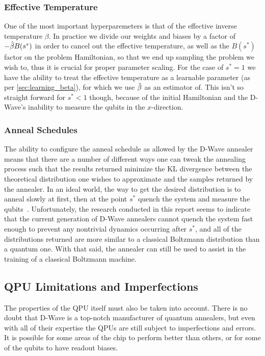 \subsubsection{Effective Temperature}
One of the most important hyperparemeters is that of the effective inverse temperature \( \beta \).
In practice we divide our weights and biases by a factor of \( -\hat{\beta} B(s^*) \) in order to cancel out the effective temperature, as well as the \( B(s^*) \) factor on the problem Hamiltonian, so that we end up sampling the problem we wish to, thus it is crucial for proper parameter scaling.
For the case of \( s^* = 1 \) we have the ability to treat the effective temperature as a learnable parameter (as per \cref{sec:learning_beta}), for which we use \( \hat{\beta} \) as an estimator of.
This isn't so straight forward for \( s^* < 1 \) though, because of the initial Hamiltonian and the D-Wave's inability to measure the qubits in the \( x \)-direction.

\subsubsection{Anneal Schedules}
The ability to configure the anneal schedule as allowed by the D-Wave annealer means that there are a number of different ways one can tweak the annealing process such that the results returned minimize the KL divergence between the theoretical distribution one wishes to approximate and the samples returned by the annealer.
In an ideal world, the way to get the desired distribution is to anneal slowly at first, then at the point \( s^* \) quench the system and measure the qubits~\cite{amin_2018}.
Unfortunately, the research conducted in this report seems to indicate that the current generation of D-Wave annealers cannot quench the system fast enough to prevent any nontrivial dynamics occurring after \( s^* \), and all of the distributions returned are more similar to a classical Boltzmann distribution than a quantum one.
With that said, the annealer can still be used to assist in the training of a classical Boltzmann machine.

\subsection{QPU Limitations and Imperfections}
The properties of the QPU itself must also be taken into account.
There is no doubt that D-Wave is a top-notch manufacturer of quantum annealers, but even with all of their expertise the QPUs are still subject to imperfections and errors.
It is possible for some areas of the chip to perform better than others, or for some of the qubits to have readout biases.

